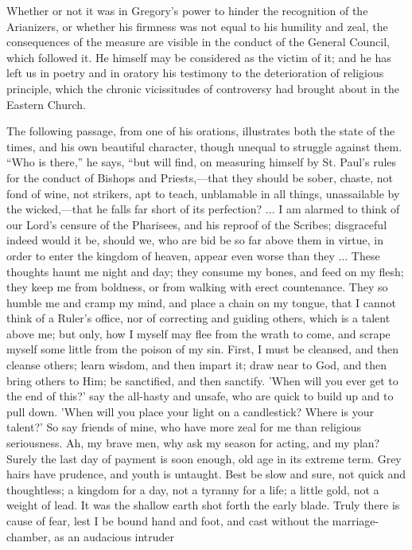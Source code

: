 Whether or not it was in Gregory's power to hinder the recognition
of the Arianizers, or whether his firmness was not equal to his
humility and zeal, the consequences of the measure are visible in the
conduct of the General Council, which followed it. He himself may be
considered as the victim of it; and he has left us in poetry and in
oratory his testimony to the deterioration of religious principle,
which the chronic vicissitudes of controversy had brought about in the
Eastern Church.

The following passage, from one of his orations, illustrates
both the state of the times, and his own beautiful character, though
unequal to struggle against them. ``Who is there,'' he says,
``but will find, on measuring himself by St. Paul's rules for the
conduct of Bishops and Priests,—that they should be sober, chaste,
not fond of wine, not strikers, apt to teach, unblamable in all
things, unassailable by the wicked,—that he falls far short of its
perfection? ... I am alarmed to think of our Lord's censure of the
Pharisees, and his reproof of the Scribes; disgraceful indeed would it
be, should we, who are bid be so far above them in virtue, in order to
enter the kingdom of heaven, appear even worse than they ... These
thoughts haunt me night and day; they consume my bones, and feed on my
flesh; they keep me from boldness, or from walking with erect
countenance. They so humble me and cramp my mind, and place a chain on
my tongue, that I cannot think of a Ruler's office, nor of correcting
and guiding others, which is a talent above me; but only, how I myself
may flee from the wrath to come, and scrape myself some little from
the poison of my sin. First, I must be cleansed, and then cleanse
others; learn wisdom, and then impart it; draw near to God, and then
bring others to Him; be sanctified, and then sanctify. 'When will you
ever get to the end of this?' say the all-hasty and unsafe, who are
quick to build up and to pull down. 'When will you place your light on
a candlestick? Where is your talent?' So say friends of mine, who have
more zeal for me than religious seriousness. Ah, my brave men, why ask
my season for acting, and my plan? Surely the last day of payment is
soon enough, old age in its extreme term. Grey hairs have
prudence, and youth is untaught. Best be slow and sure, not quick and
thoughtless; a kingdom for a day, not a tyranny for a life; a little
gold, not a weight of lead. It was the shallow earth shot forth the
early blade. Truly there is cause of fear, lest I be bound hand and
foot, and cast without the marriage-chamber, as an audacious intruder
